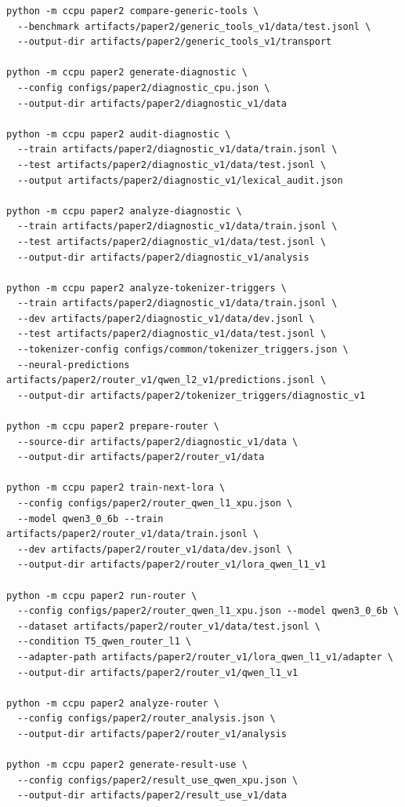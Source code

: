 \documentclass[10pt]{article}
\begin{document}
\begin{verbatim}
python -m ccpu paper2 compare-generic-tools \
  --benchmark artifacts/paper2/generic_tools_v1/data/test.jsonl \
  --output-dir artifacts/paper2/generic_tools_v1/transport

python -m ccpu paper2 generate-diagnostic \
  --config configs/paper2/diagnostic_cpu.json \
  --output-dir artifacts/paper2/diagnostic_v1/data

python -m ccpu paper2 audit-diagnostic \
  --train artifacts/paper2/diagnostic_v1/data/train.jsonl \
  --test artifacts/paper2/diagnostic_v1/data/test.jsonl \
  --output artifacts/paper2/diagnostic_v1/lexical_audit.json

python -m ccpu paper2 analyze-diagnostic \
  --train artifacts/paper2/diagnostic_v1/data/train.jsonl \
  --test artifacts/paper2/diagnostic_v1/data/test.jsonl \
  --output-dir artifacts/paper2/diagnostic_v1/analysis

python -m ccpu paper2 analyze-tokenizer-triggers \
  --train artifacts/paper2/diagnostic_v1/data/train.jsonl \
  --dev artifacts/paper2/diagnostic_v1/data/dev.jsonl \
  --test artifacts/paper2/diagnostic_v1/data/test.jsonl \
  --tokenizer-config configs/common/tokenizer_triggers.json \
  --neural-predictions artifacts/paper2/router_v1/qwen_l2_v1/predictions.jsonl \
  --output-dir artifacts/paper2/tokenizer_triggers/diagnostic_v1

python -m ccpu paper2 prepare-router \
  --source-dir artifacts/paper2/diagnostic_v1/data \
  --output-dir artifacts/paper2/router_v1/data

python -m ccpu paper2 train-next-lora \
  --config configs/paper2/router_qwen_l1_xpu.json \
  --model qwen3_0_6b --train artifacts/paper2/router_v1/data/train.jsonl \
  --dev artifacts/paper2/router_v1/data/dev.jsonl \
  --output-dir artifacts/paper2/router_v1/lora_qwen_l1_v1

python -m ccpu paper2 run-router \
  --config configs/paper2/router_qwen_l1_xpu.json --model qwen3_0_6b \
  --dataset artifacts/paper2/router_v1/data/test.jsonl \
  --condition T5_qwen_router_l1 \
  --adapter-path artifacts/paper2/router_v1/lora_qwen_l1_v1/adapter \
  --output-dir artifacts/paper2/router_v1/qwen_l1_v1

python -m ccpu paper2 analyze-router \
  --config configs/paper2/router_analysis.json \
  --output-dir artifacts/paper2/router_v1/analysis

python -m ccpu paper2 generate-result-use \
  --config configs/paper2/result_use_qwen_xpu.json \
  --output-dir artifacts/paper2/result_use_v1/data


\end{verbatim}
\end{document}
